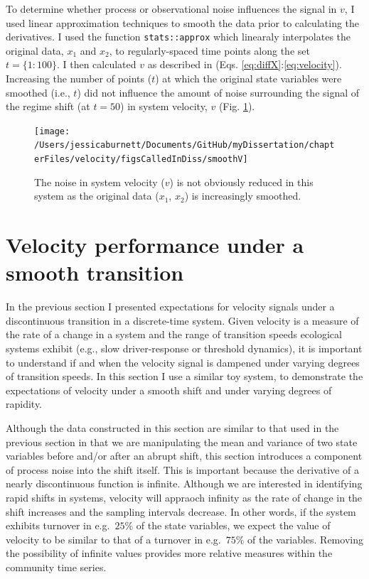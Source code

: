 \documentclass[12pt,twoside,openany]{reedthesis}
\begin{document}
To determine whether process or observational noise influences the signal in \(v\), I used linear approximation techniques to smooth the data prior to calculating the derivatives. I used the function \texttt{stats::approx} which linearaly interpolates the original data, \(x_1\) and \(x_2\), to regularly-spaced time points along the set \(t=\{1:100\}\). I then calculated \(v\) as described in (Eqs. \eqref{eq:diffX}:\eqref{eq:velocity}). Increasing the number of points (\(t\)) at which the original state variables were smoothed (i.e., \(t\)) did not influence the amount of noise surrounding the signal of the regime shift (at \(t=50\)) in system velocity, \(v\) (Fig. \ref{fig:smoothV}).
\begin{figure}
\texttt{[image: /Users/jessicaburnett/Documents/GitHub/myDissertation/chapterFiles/velocity/figsCalledInDiss/smoothV]} \caption{The noise in system velocity ($v$) is not obviously reduced in this system as the original data ($x_1$, $x_2$) is increasingly smoothed.}\label{fig:smoothV}
\end{figure}
\hypertarget{velocity-performance-under-a-smooth-transition}{%
\section{Velocity performance under a smooth transition}\label{velocity-performance-under-a-smooth-transition}}

In the previous section I presented expectations for velocity signals under a discontinuous transition in a discrete-time system. Given velocity is a measure of the rate of a change in a system and the range of transition speeds ecological systems exhibit (e.g., slow driver-response or threshold dynamics), it is important to understand if and when the velocity signal is dampened under varying degrees of transition speeds. In this section I use a similar toy system, to demonstrate the expectations of velocity under a smooth shift and under varying degrees of rapidity.

Although the data constructed in this section are similar to that used in the previous section in that we are manipulating the mean and variance of two state variables before and/or after an abrupt shift, this section introduces a component of process noise into the shift itself. This is important because the derivative of a nearly discontinuous function is infinite. Although we are interested in identifying rapid shifts in systems, velocity will appraoch infinity as the rate of change in the shift increases and the sampling intervals decrease. In other words, if the system exhibits turnover in e.g.~\(25\%\) of the state variables, we expect the value of velocity to be similar to that of a turnover in e.g.~\(75\%\) of the variables. Removing the possibility of infinite values provides more relative measures within the community time series.
\end{document}
